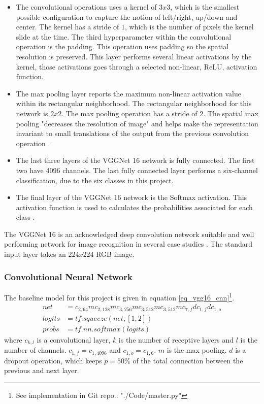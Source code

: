 \begin{itemize}
\item The convolutional operations uses a kernel of $3x3$, which is the smallest possible configuration to capture the notion of left/right, up/down and center. The kernel has a stride of $1$, which is the number of pixels the kernel slide at the time.
The third hyperparameter within the convolutional operation is the padding. This operation uses padding so the spatial resolution is preserved. This layer performs several linear activations by the kernel, those activations goes through a selected non-linear, ReLU, activation function.
\item The max pooling layer reports the maximum non-linear activation value within its rectangular neighborhood. The rectangular neighborhood for this network is $2x2$. The max pooling operation has a stride of $2$. The spatial max pooling "decreases the resolution of image" and helps make the representation invariant to small translations of the output from the previous convolution operation \cite[sec. 9]{dl_book}.
	\item The last three layers of the VGGNet 16 network is fully connected. The first two have 4096 channels. The last fully connected layer performs a six-channel classification, due to the six classes in this project.
	\item The final layer of the VGGNet 16 network is the Softmax activation. This activation function is used to calculates the probabilities associated for each class \cite[eq. 4.1]{dl_book}.  
\end{itemize}
The VGGNet 16 is an acknowledged deep convolution network suitable and well performing network for image recognition in several case studies \cite{VGGnet16, stand_cnn_notes}.  
The standard input layer takes an $224x224$ RGB image.


\subsubsection{Convolutional Neural Network}

The baseline model for this project is given in equation \ref{eq_vgg16_cnn}\footnote{See implementation in Git repo.: "./Code/master.py"}. 
\begin{equation}
\begin{aligned}
net &= c_{2,64}mc_{2,128}mc_{3,256}mc_{3,512}mc_{3,512}m c_{7,f} d c_{1, f} dc_{1,o}	\\
logits &= tf.squeeze(net, [1, 2])\\
probs &= tf.nn.softmax(logits)
\end{aligned}
\label{eq_vgg16_cnn}
\end{equation}
where $c_{k,l}$ is a convolutional layer, $k$ is the number of receptive layers and $l$ is the number of channels. $c_{1,f} = c_{1,4096}$ and $c_{1,o} = c_{1,6}$.
$m$ is the max pooling. $d$ is a dropout operation, which keeps  $p = 50\%$ of the total connection between the previous and next layer. 

